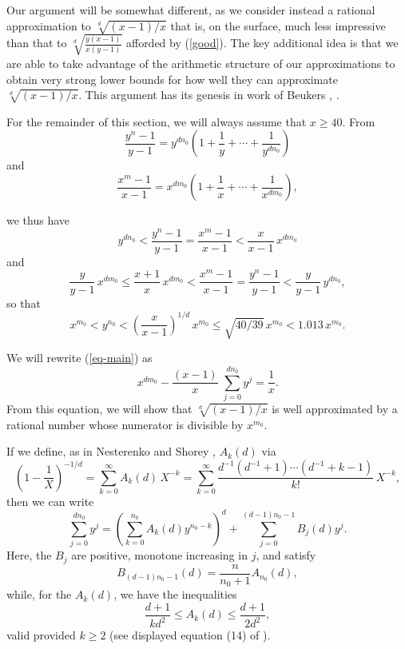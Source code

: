 Our argument will be somewhat different, as we consider instead a rational approximation to 
$\sqrt[d]{(x-1)/x}$ that is, on the surface, much less impressive than that to $\sqrt[d]{\frac{y(x-1)}{x(y-1)}}$ afforded by (\ref{good}). The key additional idea is that we are able to take advantage of the arithmetic structure of our approximations  to obtain very strong lower bounds for how well they can approximate $\sqrt[d]{(x-1)/x}$. This argument has its genesis in work of Beukers \cite{Beu1}, \cite{Beu2}.

For the remainder of this section, we will always assume that $x \geq 40$. From
 \[\frac{y^n-1}{y-1} = y^{dn_0} \left( 1 + \frac{1}{y} +  \cdots + \frac{1}{y^{dn_0}} \right)\]
 and
 \[\frac{x^m-1}{x-1} = x^{dm_0} \left( 1 + \frac{1}{x} + \cdots + \frac{1}{x^{dm_0}} \right),\]

 we thus have
 $$
y^{dn_0}  <  \frac{y^n-1}{y-1} =  \frac{x^m-1}{x-1}  < \frac{x}{x-1} \,   x^{dm_0}
$$
and
$$
\frac{y}{y-1} \, x^{dm_0} \leq \frac{x+1}{x}  \, x^{dm_0} <  \frac{x^m-1}{x-1}  =  \frac{y^n-1}{y-1} 
< \frac{y}{y-1} \, y^{dn_0},
$$
so that 
\begin{equation} \label{goop}
x^{m_0} < y^{n_0} <\left( \frac{x}{x-1} \right)^{1/d} \, x^{m_0} \leq \sqrt{40/39} \, x^{m_0} < 1.013 \, x^{m_0}.
\end{equation}


We will rewrite  (\ref{eq-main})
 as 
 $$
 x^{d m_0} -  \frac{(x-1)}{x} \;   \sum_{j=0}^{dn_0} y^j = \frac{1}{x}.
 $$
 From this equation, we will show that $\sqrt[d]{(x-1)/x}$ is well approximated by a rational number whose numerator is divisible by $x^{m_0}$.
 
If we define, as in Nesterenko and Shorey \cite{NeSh},  $A_k (d)$ via
 $$
  \left( 1 - \frac{1}{X} \right)^{-1/d} = \sum_{k=0}^\infty A_k (d) \, X^{-k} = \sum_{k=0}^\infty
  \frac{d^{-1} ( d^{-1}+1) \cdots (d^{-1} + k-1)}{k!} \, X^{-k},
 $$
 then we can write 
 $$
 \sum_{j=0}^{dn_0} y^j = \left( \sum_{k = 0}^{n_0} A_k (d) y^{n_0-k} \right)^d + \sum_{j=0}^{(d-1)n_0-1} B_j(d) y^j.
 $$
Here, the $B_j$ are positive, monotone increasing in $j$, and satisfy
 $$
 B_{(d-1)n_0-1} (d) = \frac{n}{n_0+1} A_{n_0} (d),
 $$
 while, for the $A_k(d)$, we have the inequalities
 $$
 \frac{d+1}{k d^2} \leq A_k (d) \leq  \frac{d+1}{2 d^2},
 $$
valid  provided $k \geq 2$ (see displayed equation (14) of \cite{NeSh}). 
 
